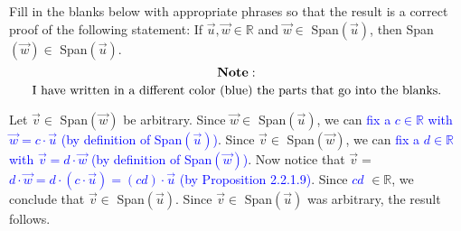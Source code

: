 \documentclass[12pt]{article}
\newenvironment{problem}[2][Problem]
{
	\begin{trivlist} 
		\item[\hskip \labelsep {\bfseries #1 #2:}]
	}
{
	\end{trivlist}
	}
\newenvironment{solution}[1][Solution]
{
	\begin{trivlist} 
		\item[\hskip \labelsep {\itshape #1:}]
	}
	{
	\end{trivlist}
}
\begin{document}
%
\begin{problem}{1}
Fill in the blanks below with appropriate phrases so that the result is a correct proof of the following statement: If $\vec{u}, \vec{w} \in \mathbb{R}$ and $ \vec{w} \in$ Span$(\vec{u})$, then Span$(\vec{w}) \in$ Span$(\vec{u})$.
\[
{\bf Note:}
\]
\[
\text{I have written in a different
color (blue) %
the parts that go into the blanks.}
\]

\begin{solution}
Let $\vec{v} \in$ Span$(\vec{w})$ be arbitrary. Since $\vec{w} \in$ Span$(\vec{u})$, we can \textcolor{blue}{fix a $c\in\mathbb{R}$ with $\vec{w}=c \cdot \vec{u}$ (by definition of Span$(\vec{u})$)}. Since $\vec{v} \in$ Span$(\vec{w})$, we can \textcolor{blue}{fix a $d\in\mathbb{R}$ with $\vec{v}=d \cdot \vec{w}$ (by definition of Span$(\vec{w})$)}. Now notice that $\vec{v}=$\textcolor{blue}{$d \cdot \vec{w} = d \cdot (c \cdot \vec{u}) = (cd) \cdot \vec{u}$ (by Proposition 2.2.1.9)}. Since \textcolor{blue}{$cd$} $\in \mathbb{R}$, we conclude that $\vec{v} \in$ Span$(\vec{u})$. Since $\vec{v} \in$ Span$(\vec{u})$ was arbitrary, the result follows.
\end{solution}
\end{problem}
\end{document}
